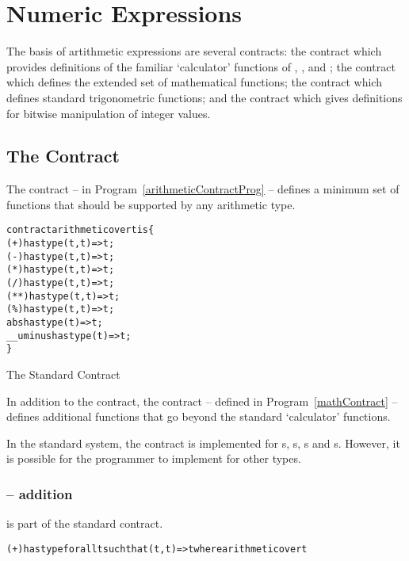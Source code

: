 \chapter{Numeric Expressions}
\label{numbers}

The basis of artithmetic expressions are several contracts: the  contract which provides definitions of the familiar `calculator' functions of \q{+}, \q{-}, \q{*} and \q{/}; the  contract which defines the extended set of mathematical functions; the  contract which defines standard trigonometric functions; and the  contract which gives definitions for bitwise manipulation of integer values.

\section{The  Contract}
\label{arithmeticContract}

The  contract -- in Program~\vref{arithmeticContractProg} -- defines a minimum set of functions that should be supported by any arithmetic type.

\begin{program}
\begin{alltt}
contract arithmetic over t is \{
  (+) has type (t,t)=>t;
  (-) has type (t,t)=>t;
  (*) has type (t,t)=>t;
  (/) has type (t,t)=>t;
  (**) has type (t,t) => t;
  (\%) has type (t,t) => t;
  abs has type (t)=>t;
  __uminus has type (t)=>t;
\}
\end{alltt}
\caption{The Standard  Contract\label{arithmeticContractProg}}
\end{program}

In addition to the  contract, the  contract -- defined in Program~\vref{mathContract} -- defines additional functions that go beyond the standard `calculator' functions.

\begin{aside}
In the standard system, the  contract is implemented for s, s, s and s. However, it is possible for the programmer to implement  for other types.
\end{aside}

\subsection{\q{+} -- addition}
\label{plusFunction}
\q{+} is part of the standard  contract.
\begin{alltt}
(+) has type for all t such that (t,t)=>t where arithmetic over t
\end{alltt}

